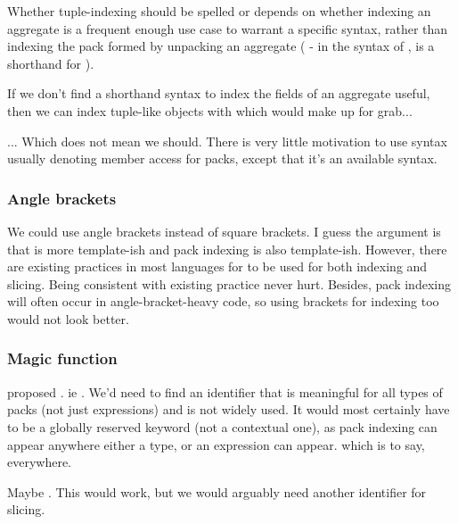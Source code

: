 \documentclass{wg21}
\begin{document}
Whether tuple-indexing should be spelled  or \tcode{[]} depends on whether indexing an aggregate is a frequent enough use case
to warrant a specific syntax, rather than indexing the pack formed by unpacking an aggregate ( - in the syntax of ,  is a shorthand for ).

If we don't find a shorthand syntax to index the fields of an aggregate useful, then we can index tuple-like objects with  which would make
 up for grab...

... Which does not mean we should. There is very little motivation to use syntax usually denoting member access for packs, except that it's an available syntax.

\subsubsection{Angle brackets}

We could use angle brackets instead of square brackets. I guess the argument is that \tcode{<>} is more template-ish and pack indexing is also template-ish.
However, there are existing practices in most languages for \tcode{[]} to be used for both indexing and slicing.
Being consistent with existing practice never hurt.
Besides, pack indexing will often occur in angle-bracket-heavy code, so using brackets for indexing too would not look better.

\subsubsection{Magic function}

 proposed . ie .
We'd need to find an identifier that is meaningful for all types of packs (not just expressions) and is not widely used.
It would most certainly have to be a globally reserved keyword (not a contextual one), as pack indexing can appear anywhere either a type, or an expression can appear. which is to say, everywhere.

Maybe . This would work, but we would arguably need another identifier for slicing.

\subsubsection{}
\end{document}
